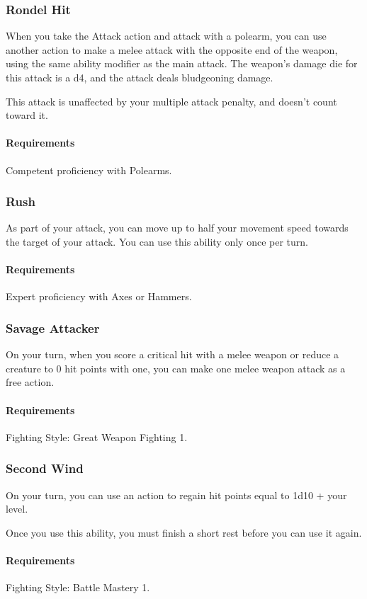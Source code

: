 \subsubsection{Rondel Hit} \label{feat::rondelhit}
    When you take the Attack action and attack with a polearm, you can use another action to make a melee attack with the opposite end of the weapon, using the same ability modifier as the main attack.
    The weapon's damage die for this attack is a d4, and the attack deals bludgeoning damage.

    This attack is unaffected by your multiple attack penalty, and doesn't count toward it.
    \paragraph{Requirements} Competent proficiency with Polearms.
\subsubsection{Rush} \label{feat::rush}
    As part of your attack, you can move up to half your movement speed towards the target of your attack.
    You can use this ability only once per turn.
    \paragraph{Requirements} Expert proficiency with Axes or Hammers.
\subsubsection{Savage Attacker} \label{feat::savageattacker}
    On your turn, when you score a critical hit with a melee weapon or reduce a creature to 0 hit points with one, you can make one melee weapon attack as a free action.
    \paragraph{Requirements} Fighting Style: Great Weapon Fighting 1.
\subsubsection{Second Wind} \label{feat::secondwind}
    On your turn, you can use an action to regain hit points equal to 1d10 + your level.

    Once you use this ability, you must finish a short rest before you can use it again.
    \paragraph{Requirements} Fighting Style: Battle Mastery 1.
